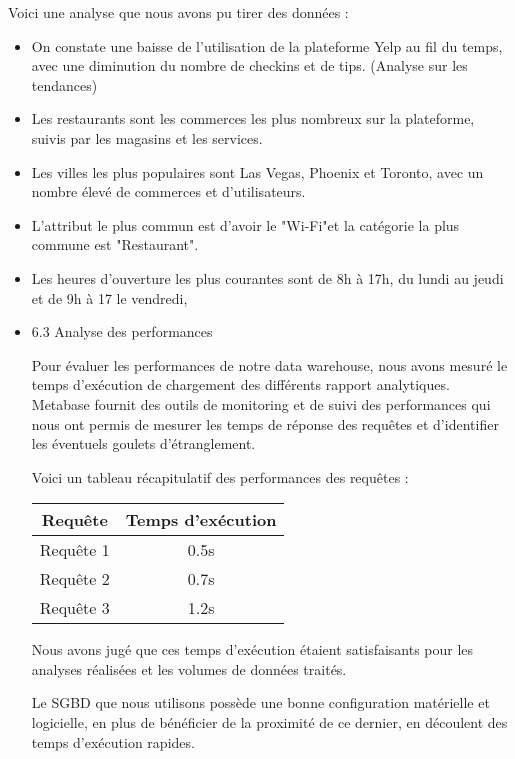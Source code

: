 \begin{itemize}
Voici une analyse que nous avons pu tirer des données :

\begin{itemize}

\item On constate une baisse de l'utilisation de la plateforme Yelp au fil du temps, avec une diminution du nombre de checkins et de tips. (Analyse sur les tendances)

\item Les restaurants sont les commerces les plus nombreux sur la plateforme, suivis par les magasins et les services.

\item Les villes les plus populaires sont Las Vegas, Phoenix et Toronto, avec un nombre élevé de commerces et d'utilisateurs.

\item L'attribut le plus commun est d'avoir le "Wi-Fi"et la catégorie la plus commune est "Restaurant".

\item Les heures d'ouverture les plus courantes sont de 8h à 17h, du lundi au jeudi et de 9h à 17 le vendredi,


\item 6.3 Analyse des performances

Pour évaluer les performances de notre data warehouse, nous avons mesuré le temps d’exécution de chargement des différents rapport analytiques.
Metabase fournit des outils de monitoring et de suivi des performances qui nous ont permis de mesurer les temps de réponse des requêtes et d’identifier les éventuels goulets d’étranglement.

Voici un tableau récapitulatif des performances des requêtes :

\begin{center}
\begin{tabular}{|c|c|}
\hline
Requête & Temps d'exécution \\
\hline
Requête 1 & 0.5s \\
\hline
Requête 2 & 0.7s \\
\hline
Requête 3 & 1.2s \\
\hline
\end{tabular}
\end{center}

Nous avons jugé que ces temps d'exécution étaient satisfaisants pour les analyses réalisées et les volumes de données traités.

Le SGBD que nous utilisons possède une bonne configuration matérielle et logicielle, en plus de bénéficier de la proximité de ce dernier, en découlent des temps d'exécution rapides.


\end{itemize}
\end{itemize}
